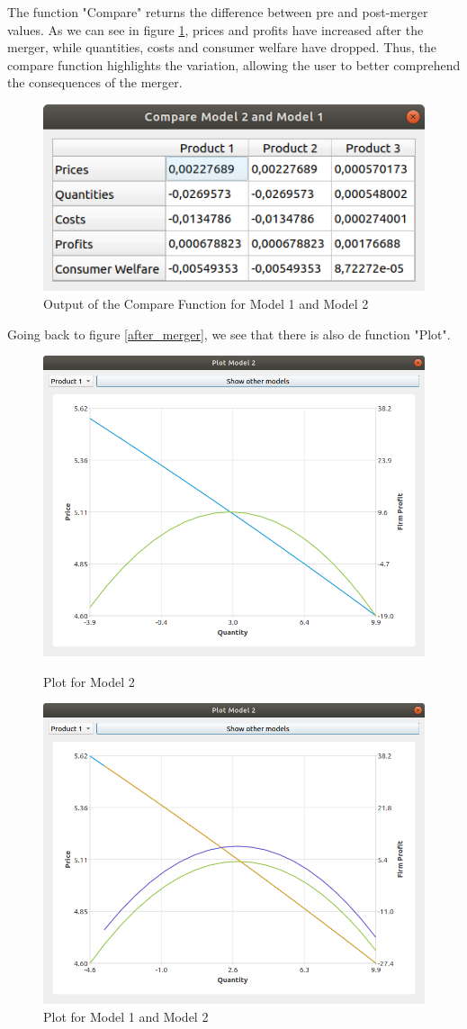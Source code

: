 \documentclass[12pt]{article}
\begin{document}
The function "Compare" returns the difference between pre and post-merger values. As we can see in figure \ref{compare}, prices and profits have increased after the merger, while quantities, costs and consumer welfare have dropped. Thus, the compare function highlights the variation, allowing the user to better comprehend the consequences of the merger. 
\begin{figure}[H]
\begin{center}
  \includegraphics[width=10 cm]{compare}
\caption{\label{compare} Output of the Compare Function for Model 1 and Model 2}
\end{center}
\end{figure}

Going back to figure \ref{after_merger}, we see that there is also de function "Plot".
\begin{figure}
\begin{center}
\begin{minipage}{2.75in}
  \includegraphics[width=5 cm]{plot_1}
\caption{\label{plot_1} Plot for Model 2}
\end{minipage}
\begin{minipage}{2.75in}
 \includegraphics[width=5 cm]{plot_2}
\caption{\label{plot_2} Plot for Model 1 and Model 2}
\end{minipage}
\end{center}
\end{figure}
\end{document}
